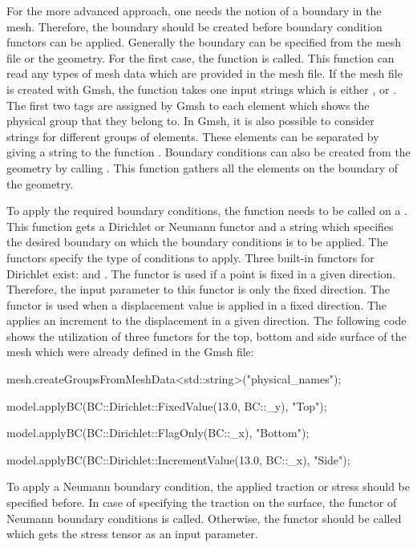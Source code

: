 For the more advanced approach, one needs the notion of a boundary in
the mesh. Therefore, the boundary should be created before boundary
condition functors can be applied. Generally the boundary can be
specified from the mesh file or the geometry.  For the first case, the
function  is called.  This function
can read any types of mesh data which are provided in the mesh
file. If the mesh file is created with Gmsh, the function takes one
input strings which is either ,  or
. The first two tags are assigned by Gmsh to
each element which shows the physical group that they belong to. In
Gmsh, it is also possible to consider strings for different groups of
elements. These elements can be separated by giving a string
 to the function
.  Boundary conditions can also be
created from the geometry by calling
. This function gathers all the
elements on the boundary of the geometry.

To apply the required boundary conditions, the function 
needs to be called on a . This function
gets a Dirichlet or Neumann functor and a string which specifies the
desired boundary on which the boundary conditions is to be
applied. The functors specify the type of conditions to apply. Three
built-in functors for Dirichlet exist: 
and . The functor  is used if a
point is fixed in a given direction. Therefore, the input parameter to
this functor is only the fixed direction. The 
functor is used when a displacement value is applied in a fixed
direction. The  applies an increment to the
displacement in a given direction. The following code shows the
utilization of three functors for the top, bottom and side surface of
the mesh which were already defined in the Gmsh file:

\begin{cpp}
mesh.createGroupsFromMeshData<std::string>("physical_names");

model.applyBC(BC::Dirichlet::FixedValue(13.0, BC::_y), "Top");

model.applyBC(BC::Dirichlet::FlagOnly(BC::_x), "Bottom");

model.applyBC(BC::Dirichlet::IncrementValue(13.0, BC::_x), "Side");
\end{cpp}

To apply a Neumann boundary condition, the applied traction or stress
should be specified before. In case of specifying the traction on the
surface, the functor  of Neumann boundary
conditions is called. Otherwise, the functor  should
be called which gets the stress tensor as an input parameter.

